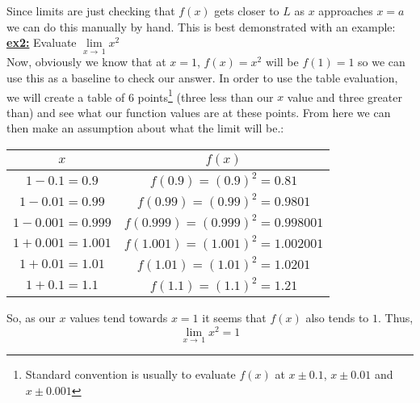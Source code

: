 \documentclass[addpoints]{exam}
\begin{document}
  \begin{tcolorbox}[breakable, title=TABLE EVALUATION, colframe=black, sharp corners, colback=white, colbacktitle=white, coltitle=black]
    Since limits are just checking that $f(x)$ gets closer to $L$ as $x$ approaches $x=a$ we can do this manually by hand. This is best demonstrated with an example: \\
    \underline{\textbf{ex2:}} Evaluate $\lim\limits_{x\to\,1} x^2$ \\
    Now, obviously we know that at $x=1$, $f(x)=x^2$ will be $f(1)=1$ so we can use this as a baseline to check our answer. In order to use the table evaluation, we will create a table of 6 points\footnote{Standard convention is usually to evaluate $f(x)$ at $x \pm 0.1$, $x \pm 0.01$ and $x \pm 0.001$} (three less than our $x$ value and three greater than) and see what our function values are at these points. From here we can then make an assumption about what the limit will be.: \\
    \begin{center}
      \begin{tabular}{|c|c|}
          \hline
          $x$ & $f(x)$ \\
          \hline
          $1-0.1 = 0.9$ & $f(0.9)=(0.9)^2 = 0.81$ \\
          \hline
          $1-0.01 = 0.99$ & $f(0.99)=(0.99)^2 = 0.9801$ \\
          \hline
          $1-0.001 = 0.999$ & $f(0.999)=(0.999)^2 = 0.998001$ \\
          \hline
          $1 + 0.001 = 1.001$ & $f(1.001)=(1.001)^2 = 1.002001$ \\
          \hline
          $1 + 0.01 = 1.01$ & $f(1.01)=(1.01)^2 = 1.0201$ \\
          \hline
          $1 + 0.1 = 1.1$ & $f(1.1)=(1.1)^2 = 1.21$ \\
          \hline
      \end{tabular}
    \end{center}
    So, as our $x$ values tend towards $x=1$ it seems that $f(x)$ also tends to $1$. Thus, 
    \[\boxed{\lim\limits_{x\to\,1} x^2 = 1}\]
  \end{tcolorbox}
  \newpage 
\end{document}
